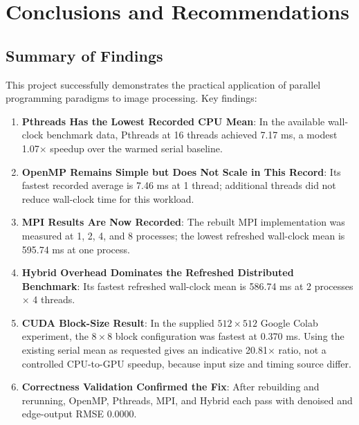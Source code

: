 \documentclass[12pt,a4paper]{report}
\begin{document}
\newpage

\chapter{Conclusions and Recommendations}

\section{Summary of Findings}

This project successfully demonstrates the practical application of parallel programming paradigms to image processing. Key findings:

\begin{enumerate}
    \item \textbf{Pthreads Has the Lowest Recorded CPU Mean}: In the available wall-clock benchmark data, Pthreads at 16 threads achieved 7.17 ms, a modest 1.07$\times$ speedup over the warmed serial baseline.
    
    \item \textbf{OpenMP Remains Simple but Does Not Scale in This Record}: Its fastest recorded average is 7.46 ms at 1 thread; additional threads did not reduce wall-clock time for this workload.
    
    \item \textbf{MPI Results Are Now Recorded}: The rebuilt MPI implementation was measured at 1, 2, 4, and 8 processes; the lowest refreshed wall-clock mean is 595.74 ms at one process.
    
    \item \textbf{Hybrid Overhead Dominates the Refreshed Distributed Benchmark}: Its fastest refreshed wall-clock mean is 586.74 ms at 2 processes $\times$ 4 threads.
    
    \item \textbf{CUDA Block-Size Result}: In the supplied $512 \times 512$ Google Colab experiment, the $8 \times 8$ block configuration was fastest at 0.370 ms. Using the existing serial mean as requested gives an indicative 20.81$\times$ ratio, not a controlled CPU-to-GPU speedup, because input size and timing source differ.
    
    \item \textbf{Correctness Validation Confirmed the Fix}: After rebuilding and rerunning, OpenMP, Pthreads, MPI, and Hybrid each pass with denoised and edge-output RMSE 0.0000.
\end{enumerate}
\end{document}

